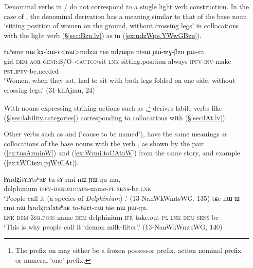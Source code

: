 Denominal verbs in / do not correspond to a single light verb construction. In the case of , the denominal derivation has a meaning similar to that of the base noun  `sitting position of women on the ground, without crossing legs' in collocations with the light verb  (§\ref{sec:Bzu.lv}) as in (\ref{ex:ndzWpe.YWwGBzu}).

\begin{exe}
\ex \label{ex:ndzWpe.YWwGBzu}
 \gll tɕʰeme nɯ kɤ-kɯ-ɤ<nɯ>mdzɯ tɕe ndzɯpe ntsɯ ɲɯ́-wɣ-βzu pɯ-ra. \\
 girl \textsc{dem} \textsc{aor}-\textsc{genr}:S/O-<\textsc{auto}>sit \textsc{lnk} sitting.position always \textsc{ipfv}-\textsc{inv}-make \textsc{pst}.\textsc{ipfv}-be.needed \\
 \glt `Women, when they sat, had to sit with both legs folded on one side, without crossing legs.' (31-khAjmu, 24)
\end{exe}

With nouns expressing striking actions such as ,\footnote{The  prefix on   may either be a frozen possessor prefix, action nominal prefix or numeral `one' prefix. }   derives labile verbs like  (§\ref{sec:lability.categories}) corresponding to collocations with  (§\ref{sec:lAt.lv}).


Other verbs such as  and  (`cause to be named'), have the same meanings as collocations of the base nouns with the verb , as shown by the pair  (\ref{ex:tusArminW}) and (\ref{ex:Wrmi.toCAtnW}) from the same story, and example (\ref{ex:tWCtsxi.pjWtCAt}).

\begin{exe}
\ex 
\begin{xlist}
\ex \label{ex:tusArminW}
 \gll ɬɤndʐitɤlɤtsʰaʁ tu-sɤ-rmi-nɯ ɲɯ-ŋu ma, \\
 delphinium \textsc{ipfv}-\textsc{denom}:\textsc{caus}-name-\textsc{pl} \textsc{sens}-be \textsc{lnk} \\
\glt `People call it (a species of \textit{Delphinium})  .' (13-NanWkWmtsWG, 135)
\ex \label{ex:Wrmi.toCAtnW}
 \gll  tɕe nɯ ɯ-rmi nɯ ɬɤndʐitɤlɤtsʰaʁ to-tɕɤt-nɯ tɕe nɯ ɲɯ-ŋu. \\
 \textsc{lnk} \textsc{dem} \textsc{3sg}.\textsc{poss}-name \textsc{dem} delphinium \textsc{ifr}-take.out-\textsc{pl} \textsc{lnk} \textsc{dem} \textsc{sens}-be \\
\glt `This is why people call it  `demon milk-filter'.' (13-NanWkWmtsWG, 140)
\end{xlist}
\end{exe}

